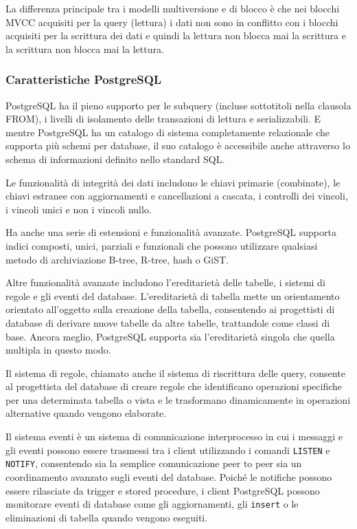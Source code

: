 La differenza principale tra i modelli multiversione e di blocco \`{e} che nei blocchi MVCC acquisiti per la query (lettura) i dati non sono in conflitto con i blocchi acquisiti per la scrittura dei dati e quindi la lettura non blocca mai la scrittura e la scrittura non blocca mai la lettura.\cite{etichetta15}

\subsubsection{Caratteristiche PostgreSQL}
PostgreSQL ha il pieno supporto per le subquery (incluse sottotitoli nella clausola FROM), i livelli di isolamento delle transazioni di lettura e serializzabili. E mentre PostgreSQL ha un catalogo di sistema completamente relazionale che supporta pi\`{u} schemi per database, il suo catalogo \`{e} accessibile anche attraverso lo schema di informazioni definito nello standard SQL.

Le funzionalit\`{a} di integrit\`{a} dei dati includono le chiavi primarie (combinate), le chiavi estranee con aggiornamenti e cancellazioni a cascata, i controlli dei vincoli, i vincoli unici e non i vincoli nullo.

Ha anche una serie di estensioni e funzionalit\`{a} avanzate. PostgreSQL supporta indici composti, unici, parziali e funzionali che possono utilizzare qualsiasi metodo di archiviazione B-tree, R-tree, hash o GiST.

Altre funzionalit\`{a} avanzate includono l'ereditariet\`{a} delle tabelle, i sistemi di regole e gli eventi del database. L'ereditarietà di tabella mette un orientamento orientato all'oggetto sulla creazione della tabella, consentendo ai progettisti di database di derivare nuove tabelle da altre tabelle, trattandole come classi di base. Ancora meglio, PostgreSQL supporta sia l'ereditarietà singola che quella multipla in questo modo.

Il sistema di regole, chiamato anche il sistema di riscrittura delle query, consente al progettista del database di creare regole che identificano operazioni specifiche per una determinata tabella o vista e le trasformano dinamicamente in operazioni alternative quando vengono elaborate.

Il sistema eventi \`{e} un sistema di comunicazione interprocesso in cui i messaggi e gli eventi possono essere trasmessi tra i client utilizzando i comandi \verb"LISTEN" e \verb"NOTIFY", consentendo sia la semplice comunicazione peer to peer sia un coordinamento avanzato sugli eventi del database. Poich\'{e} le notifiche possono essere rilasciate da trigger e stored procedure, i client PostgreSQL possono monitorare eventi di database come gli aggiornamenti, gli \verb"insert" o le eliminazioni di tabella quando vengono eseguiti.\cite{etichetta15}

